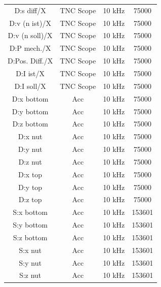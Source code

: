 \begin{center}
\begin{longtable}{c c c c}
 D:s diff/X & TNC Scope & 10 kHz & 75000 \\ 

 D:v (n ist)/X & TNC Scope & 10 kHz & 75000 \\ 

 D:v (n soll)/X & TNC Scope & 10 kHz & 75000 \\ 

 D:P mech./X & TNC Scope & 10 kHz & 75000 \\ 
 
 D:Pos. Diff./X & TNC Scope & 10 kHz & 75000 \\ 

 D:I ist/X & TNC Scope & 10 kHz & 75000 \\ 

 D:I soll/X & TNC Scope & 10 kHz & 75000 \\ 

 D:x bottom & Acc & 10 kHz & 75000 \\ 

 D:y bottom & Acc & 10 kHz & 75000 \\ 

 D:z bottom & Acc & 10 kHz & 75000 \\ 

 D:x nut & Acc & 10 kHz & 75000 \\ 

 D:y nut & Acc & 10 kHz & 75000 \\ 

 D:z nut & Acc & 10 kHz & 75000 \\ 

 D:x top & Acc & 10 kHz & 75000 \\

 D:y top & Acc & 10 kHz & 75000 \\ 

 D:z top & Acc & 10 kHz & 75000 \\ 

 S:x bottom & Acc & 10 kHz & 153601 \\ 

 S:y bottom & Acc & 10 kHz & 153601 \\ 

 S:z bottom & Acc & 10 kHz & 153601 \\ 

 S:x nut & Acc & 10 kHz & 153601 \\ 

 S:y nut & Acc & 10 kHz & 153601 \\ 

 S:z nut & Acc & 10 kHz & 153601 \\ 


\end{longtable}
\end{center}
